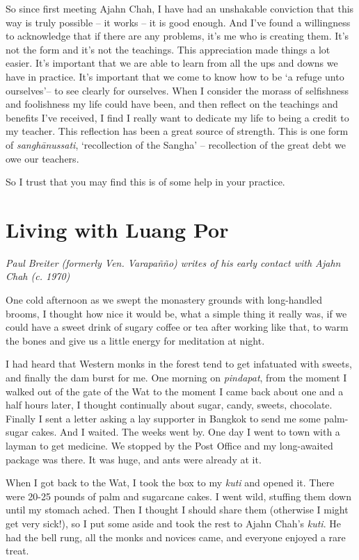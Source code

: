 So since first meeting Ajahn Chah, I have had an unshakable conviction
that this way is truly possible -- it works -- it is good enough. And
I've found a willingness to acknowledge that if there are any problems, 
it's me who is creating them. It's not the form and it's not the
teachings. This appreciation made things a lot easier. It's important
that we are able to learn from all the ups and downs we have in
practice. It's important that we come to know how to be `a refuge unto
ourselves'-- to see clearly for ourselves. When I consider the morass of
selfishness and foolishness my life could have been, and then reflect on
the teachings and benefits I've received, I find I really want to
dedicate my life to being a credit to my teacher. This reflection has
been a great source of strength. This is one form of
\emph{sanghānussati}, `recollection of the Sangha' -- recollection of
the great debt we owe our teachers. 

So I trust that you may find this is of some help in your practice. 

\chapter{Living with Luang Por}

\emph{Paul Breiter (formerly Ven. Varapañño) writes of his early contact with
Ajahn Chah (c. 1970)}

One cold afternoon as we swept the monastery grounds with long-handled
brooms, I thought how nice it would be, what a simple thing it really
was, if we could have a sweet drink of sugary coffee or tea after
working like that, to warm the bones and give us a little energy for
meditation at night. 

I had heard that Western monks in the forest tend to get infatuated with
sweets, and finally the dam burst for me. One morning on
\emph{pindapat}, from the moment I walked out of the gate of the Wat to
the moment I came back about one and a half hours later, I thought
continually about sugar, candy, sweets, chocolate. Finally I sent a
letter asking a lay supporter in Bangkok to send me some palm-sugar
cakes. And I waited. The weeks went by. One day I went to town with a
layman to get medicine. We stopped by the Post Office and my
long-awaited package was there. It was huge, and ants were already at
it. 

When I got back to the Wat, I took the box to my \emph{kuti} and opened
it. There were 20-25 pounds of palm and sugarcane cakes. I went wild,
stuffing them down until my stomach ached. Then I thought I should share
them (otherwise I might get very sick!), so I put some aside and took
the rest to Ajahn Chah's \emph{kuti}. He had the bell rung, all the
monks and novices came, and everyone enjoyed a rare treat. 

